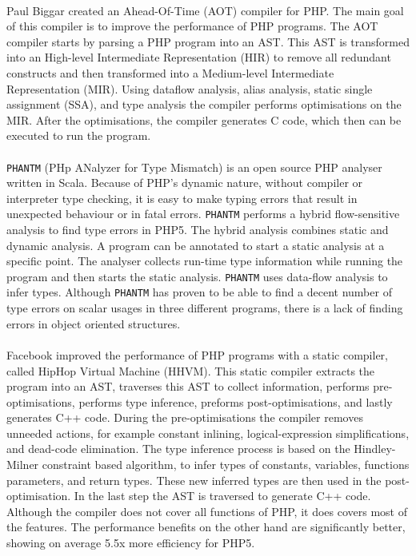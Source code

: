 \documentclass[../main.tex]{subfiles}
\begin{document}
    \paragraph{}
    Paul Biggar created an Ahead-Of-Time (AOT) compiler for PHP\cite{Big:10}.
    The main goal of this compiler is to improve the performance of PHP programs.
    The AOT compiler starts by parsing a PHP program into an AST.
    This AST is transformed into an High-level Intermediate Representation (HIR) to remove all redundant constructs and then transformed into a Medium-level Intermediate Representation (MIR).
    Using dataflow analysis, alias analysis, static single assignment (SSA), and type analysis the compiler performs optimisations on the MIR.
    After the optimisations, the compiler generates C code, which then can be executed to run the program.
   
    \paragraph{}
    \texttt{PHANTM}\cite{Kne:10,Bar:10} (PHp ANalyzer for Type Mismatch) is an open source PHP analyser written in Scala.
    Because of PHP's dynamic nature, without compiler or interpreter type checking, it is easy to make typing errors that result in unexpected behaviour or in fatal errors.
    \texttt{PHANTM} performs a hybrid flow-sensitive analysis to find type errors in PHP5.
    The hybrid analysis combines static and dynamic analysis.
    A program can be annotated to start a static analysis at a specific point.
    The analyser collects run-time type information while running the program and then starts the static analysis.
    \texttt{PHANTM} uses data-flow analysis to infer types.
    Although \texttt{PHANTM} has proven to be able to find a decent number of type errors on scalar usages in three different programs, there is a lack of finding errors in object oriented structures.
    
    \paragraph{}
    Facebook improved the performance of PHP programs with a static compiler, called HipHop Virtual Machine\cite{Zha:12} (HHVM).
    This static compiler extracts the program into an AST, traverses this AST to collect information, performs pre-optimisations, performs type inference, preforms post-optimisations, and lastly generates C++ code.
    During the pre-optimisations the compiler removes unneeded actions, for example constant inlining, logical-expression simplifications, and dead-code elimination.
    The type inference process is based on the Hindley-Milner constraint based algorithm\cite{Dam:82}, to infer types of constants, variables, functions parameters, and return types.
    These new inferred types are then used in the post-optimisation.
    In the last step the AST is traversed to generate C++ code.
    Although the compiler does not cover all functions of PHP, it does covers most of the features.
    The performance benefits on the other hand are significantly better, showing on average 5.5x more efficiency for PHP5.
        
\end{document}
